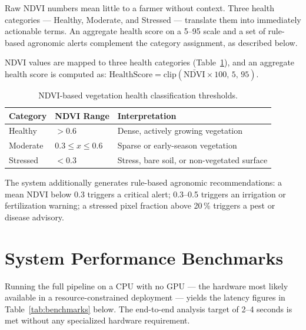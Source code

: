 \documentclass[12pt,a4paper,oneside]{report}
\begin{document}
Raw NDVI numbers mean little to a farmer without context. Three health categories — Healthy, Moderate, and Stressed — translate them into immediately actionable terms. An aggregate health score on a 5--95 scale and a set of rule-based agronomic alerts complement the category assignment, as described below.

NDVI values are mapped to three health categories (Table~\ref{tab:health_thresholds}),
and an aggregate health score is computed as:
$\mathrm{HealthScore} = \mathrm{clip}(\bar{\mathrm{NDVI}} \times 100,\, 5,\, 95)$.

\begin{table}[h]
\centering
\caption{NDVI-based vegetation health classification thresholds.}
\label{tab:health_thresholds}
\begin{tabular}{lll}
\toprule
\textbf{Category} & \textbf{NDVI Range} & \textbf{Interpretation} \\
\midrule
Healthy   & $> 0.6$              & Dense, actively growing vegetation \\
Moderate  & $0.3 \leq x \leq 0.6$ & Sparse or early-season vegetation \\
Stressed  & $< 0.3$              & Stress, bare soil, or non-vegetated surface \\
\bottomrule
\end{tabular}
\end{table}

The system additionally generates rule-based agronomic recommendations: a mean NDVI
below 0.3 triggers a critical alert; 0.3--0.5 triggers an irrigation or fertilization
warning; a stressed pixel fraction above 20\,\% triggers a pest or disease advisory.

\section{System Performance Benchmarks}

Running the full pipeline on a CPU with no GPU — the hardware most likely available in a resource-constrained deployment — yields the latency figures in Table~\ref{tab:benchmarks} below. The end-to-end analysis target of 2--4 seconds is met without any specialized hardware requirement.
\end{document}
